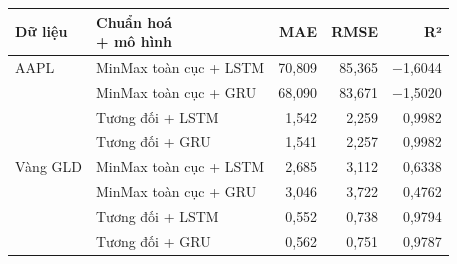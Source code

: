 \begin{tabular}{llrrr}
\toprule
Dữ liệu & \makecell[l]{Chuẩn hoá\\+ mô hình} & MAE & RMSE & R² \\
\midrule
AAPL & MinMax toàn cục + LSTM & 70{,}809 & 85{,}365 & \ensuremath{-}1{,}6044 \\
 & MinMax toàn cục + GRU & 68{,}090 & 83{,}671 & \ensuremath{-}1{,}5020 \\
 & Tương đối + LSTM & 1{,}542 & 2{,}259 & 0{,}9982 \\
 & Tương đối + GRU & 1{,}541 & 2{,}257 & 0{,}9982 \\
\midrule
Vàng GLD & MinMax toàn cục + LSTM & 2{,}685 & 3{,}112 & 0{,}6338 \\
 & MinMax toàn cục + GRU & 3{,}046 & 3{,}722 & 0{,}4762 \\
 & Tương đối + LSTM & 0{,}552 & 0{,}738 & 0{,}9794 \\
 & Tương đối + GRU & 0{,}562 & 0{,}751 & 0{,}9787 \\
\bottomrule
\end{tabular}
